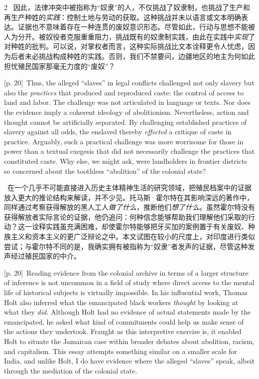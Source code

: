 \documentclass[10pt,a4paper]{article}
\begin{document}
\begin{paracol}{2}
\switchcolumn*
{\scriptsize\color{gray} [p. 20]}\ 因此，法律冲突中被指称为“奴隶”的人，不仅挑战了奴隶制，也挑战了生产和再生产种姓的\textit{实践}：控制土地与劳动的获取。这种挑战并未以语言或文本明确表达。证据也不意味着存在一种连贯的废奴意识形态。尽管如此，行动与思想不能被人为分开。被奴役者克服重重阻力，挑战既有的奴隶制实践，由此在实践中\textit{实现}了对种姓的批判。可以说，对掌权者而言，这种实际挑战比文本诠释更令人忧虑，因为后者未必挑战构成种姓的实践。否则，我们不禁要问，边疆地区的地主为何如此担忧殖民国家那毫无力度的“废奴”？\par
\switchcolumn
{\scriptsize\color{gray} [p. 20]}\ Thus, the alleged “slaves” in legal conflicts challenged not only slavery but also the \textit{practices} that produced and reproduced caste: the control of access to land and labor. The challenge was not articulated in language or texts. Nor does the evidence imply a coherent ideology of abolitionism. Nevertheless, action and thought cannot be artificially separated. By challenging established practices of slavery against all odds, the enslaved thereby \textit{effected} a critique of caste in practice. Arguably, such a practical challenge was more worrisome for those in power than a textual exegesis that did not necessarily challenge the practices that constituted caste. Why else, we might ask, were landholders in frontier districts so concerned about the toothless “abolition” of the colonial state?\par
\switchcolumn*
{\scriptsize\color{gray} [p. 20]}\ 在一个几乎不可能直接进入历史主体精神生活的研究领域，把殖民档案中的证据放入更大的推论结构来解读，并不少见。托马斯·霍尔特在其影响深远的著作中，同样通过考察获得解放的黑人工人\textit{做了什么}，推断他们\textit{想了什么}。虽然霍尔特没有获得解放者实际言论的证据，他仍追问：何种信念能够帮助我们理解他们采取的行动？这一诠释实践虽充满困难，却使霍尔特能够把牙买加的案例置于有关废奴、种族主义和资本主义的更广泛辩论之中。本文试图在较小的尺度上，对印度进行类似尝试；与霍尔特不同的是，我确实拥有被指称为“奴隶”者发声的证据，尽管这种发声经过殖民国家的中介。\par
\switchcolumn
{\scriptsize\color{gray} [p. 20]}\ Reading evidence from the colonial archive in terms of a larger structure of inference is not uncommon in a field of study where direct access to the mental life of historical subjects is virtually impossible. In his influential work, Thomas Holt also inferred what the emancipated black workers \textit{thought} by looking at what they \textit{did.} Although Holt had no evidence of actual statements made by the emancipated, he asked what kind of commitments could help us make sense of the actions they undertook. Fraught as this interpretive exercise is, it enabled Holt to situate the Jamaican case within broader debates about abolition, racism, and capitalism. This essay attempts something similar on a smaller scale for India, and unlike Holt, I do have evidence where the alleged “slaves” speak, albeit through the mediation of the colonial state.\par

\end{paracol}
\end{document}
